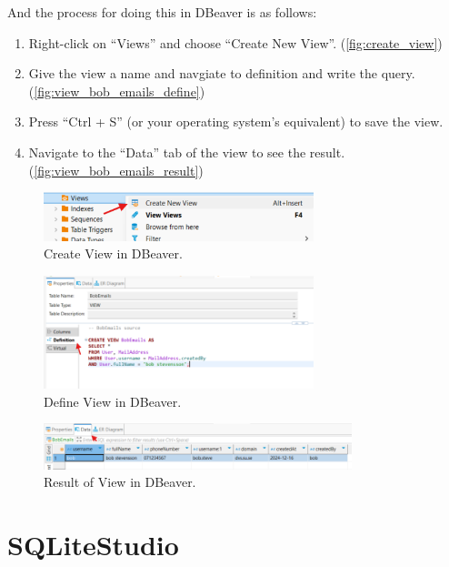 \documentclass[a4paper,11pt,oneside]{article}
\begin{document}
\begin{sloppypar}
And the process for doing this in DBeaver is as follows:
\begin{enumerate}
  \item Right-click on ``Views'' and choose ``Create New View''. (\autoref{fig:create_view})
  \item Give the view a name and navgiate to definition and write the query. (\autoref{fig:view_bob_emails_define})
  \item Press ``Ctrl + S'' (or your operating system's equivalent) to save the view.
  \item Navigate to the ``Data'' tab of the view to see the result. (\autoref{fig:view_bob_emails_result})
\end{enumerate}


\begin{figure}[!htb]
  \centering
  \includegraphics[width=0.7\textwidth]{dbeaver/create_view.png}
  \caption{Create View in DBeaver.}
  \label{fig:create_view}
\end{figure}

\begin{figure}[!htb]
  \centering
  \includegraphics[width=0.7\textwidth]{dbeaver/view_bob_emails_define.png}
  \caption{Define View in DBeaver.}
  \label{fig:view_bob_emails_define}
\end{figure}

\begin{figure}[!htb]
  \centering
  \includegraphics[width=0.8\textwidth]{dbeaver/view_bob_emails_result.png}
  \caption{Result of View in DBeaver.}
  \label{fig:view_bob_emails_result}
\end{figure}

\section{SQLiteStudio}
\label{sqliteStudio}


\end{sloppypar}
\end{document}
